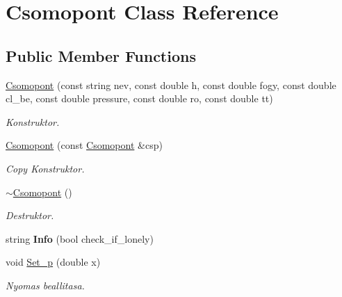 \hypertarget{class_csomopont}{}\section{Csomopont Class Reference}
\label{class_csomopont}
\subsection*{Public Member Functions}
\begin{DoxyCompactItemize}
\item 
\mbox{\label{class_csomopont_af04abc9d2970dd817ff15cb675925635}} 
\hyperlink{class_csomopont_af04abc9d2970dd817ff15cb675925635}{Csomopont} (const string nev, const double h, const double fogy, const double cl\+\_\+be, const double pressure, const double ro, const double tt)
\begin{DoxyCompactList}\small\item\em Konstruktor. \end{DoxyCompactList}\item 
\mbox{\label{class_csomopont_ab75df66e91e91f104d743c821ca58acf}} 
\hyperlink{class_csomopont_ab75df66e91e91f104d743c821ca58acf}{Csomopont} (const \hyperlink{class_csomopont}{Csomopont} \&csp)
\begin{DoxyCompactList}\small\item\em Copy Konstruktor. \end{DoxyCompactList}\item 
\mbox{\label{class_csomopont_a54cde5164ba96dc2898d345ebae8dc95}} 
\hyperlink{class_csomopont_a54cde5164ba96dc2898d345ebae8dc95}{$\sim$\+Csomopont} ()
\begin{DoxyCompactList}\small\item\em Destruktor. \end{DoxyCompactList}\item 
\mbox{\label{class_csomopont_aa0c6ab58c1766936385ff855d8c7d87b}} 
string {\bfseries Info} (bool check\+\_\+if\+\_\+lonely)
\item 
\mbox{\label{class_csomopont_a77f11475136286565a249513a7312206}} 
void \hyperlink{class_csomopont_a77f11475136286565a249513a7312206}{Set\+\_\+p} (double x)
\begin{DoxyCompactList}\small\item\em Nyomas beallitasa. \end{DoxyCompactList}\item 

\end{DoxyCompactItemize}
